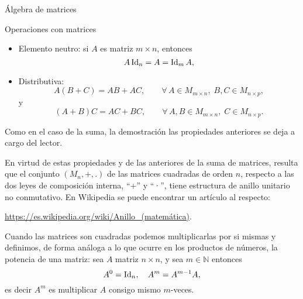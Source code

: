 \begin{chapter}{\'Algebra de matrices}
\begin{section}{Operaciones con matrices}
\begin{itemize}
                    \item Elemento neutro: si  $A$ es matriz $m \times n$,  entonces
                    \begin{equation*}
                    A\operatorname{Id}_{n} = A = \operatorname{Id}_{m}A,
                    \end{equation*}
                    \item Distributiva:
                    \begin{equation*}
                    A(B + C) = AB + AC,\qquad \forall\, A \in M_{m \times n}, \;B, C \in M_{n \times p},
                    \end{equation*}
                    y
                    \begin{equation*}
                    (A+ B)C = AC + BC,\qquad \forall\, A, B \in M_{m \times n}, \; C \in M_{n \times p}.
                    \end{equation*}
                \end{itemize}    
                
                Como en el caso de la suma,  la demostración las propiedades anteriores se deja a cargo del lector. 
                
                En virtud de estas propiedades y de las anteriores de la suma de matrices, resulta que el conjunto $(M_n ,+,.)$  de las matrices cuadradas de orden $n$, respecto a las dos leyes de composición interna, ``+'' y ``·'', tiene estructura de anillo unitario no conmutativo. En Wikipedia se puede encontrar un artículo al respecto:
                \begin{center}
                    \href{ https://es.wikipedia.org/wiki/Anillo\_(matemática)}{ https://es.wikipedia.org/wiki/Anillo\_(matemática)}.     
                \end{center}
                
                Cuando las matrices son cuadradas podemos multiplicarlas por si mismas y  definimos,  de forma análoga a lo que ocurre en los productos de números, la potencia de una matriz: sea $A$ matriz $n \times n$, y sea $m \in \mathbb N$ entonces
                \begin{equation*}
                A^0 = \operatorname{Id}_{n}, \quad A^m = A^{m-1}A,        
                \end{equation*}
                es decir $A^m$ es multiplicar $A$ consigo mismo $m$-veces.  
                

\end{section}
\end{chapter}
